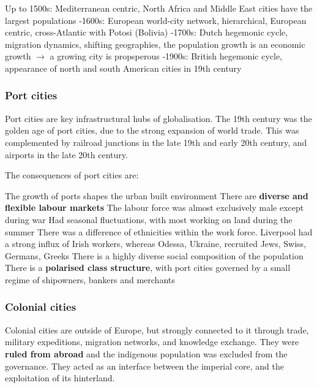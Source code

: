 \documentclass{article}
\begin{document}
\begin{outline}
	\1 Up to 1500s: Mediterranean centric, North Africa and Middle East cities have the largest populations
	-1600s:  European world-city network, hierarchical, European centric, cross-Atlantic with Potosi (Bolivia)
	-1700s: Dutch hegemonic cycle, migration dynamics, shifting geographies, the population growth is an economic growth $\rightarrow$ a growing city is propsperous
	-1900s: British hegemonic cycle, appearance of north and south American cities in 19th century
\end{outline}

\subsubsection{Port cities}

Port cities are key infrastructural hubs of globalisation. The 19th century was the golden age of port cities, due to the strong expansion of world trade. This was complemented by railroad junctions in the late 19th and early 20th century, and airports in the late 20th century.

The consequences of port cities are:

\begin{outline}
	\1 The growth of ports shapes the urban built environment
	\1 There are \textbf{diverse and flexible labour markets}
		\2 The labour force was almost exclusively male except during war
		\2 Had seasonal fluctuations, with most working on land during the summer
		\2 There was a difference of ethnicities within the work force. Liverpool had a strong influx of Irish workers, whereas Odessa, Ukraine, recruited Jews, Swiss, Germans, Greeks
	\1 There is a highly diverse social composition of the population
	\1 There is a \textbf{polarised class structure}, with port cities governed by a small regime of shipowners, bankers and merchants
\end{outline}

\subsubsection{Colonial cities}

Colonial cities are outside of Europe, but strongly connected to it through trade, military expeditions, migration networks, and knowledge exchange. They were \textbf{ruled from abroad} and the indigenous population was excluded from the governance. They acted as an interface between the imperial core, and the exploitation of its hinterland.
\end{document}
